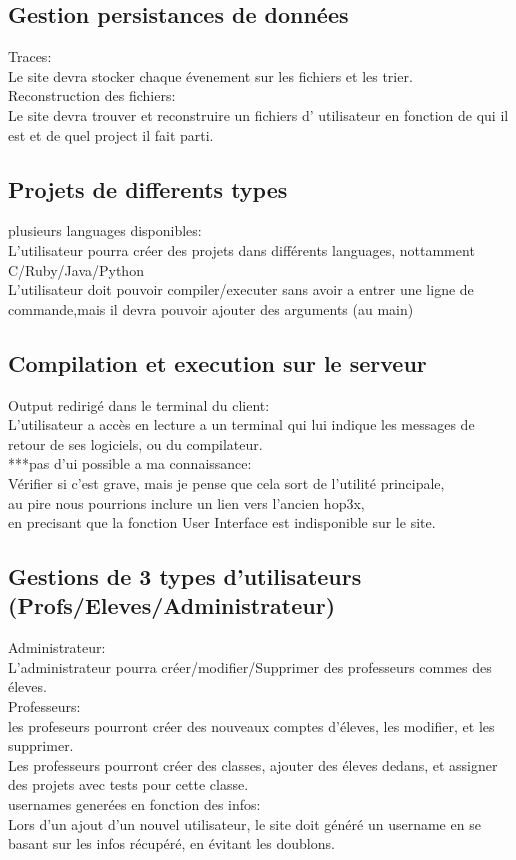 \documentclass[12pt,a4paper,twoside]{article}
\begin{document}
\subsection{Gestion persistances de données}
Traces:\\
Le site devra stocker chaque évenement sur les fichiers et les trier.\\
Reconstruction des fichiers:\\
Le site devra trouver et reconstruire un fichiers d' utilisateur en fonction de qui il est et de quel project il fait parti.\\
\subsection{Projets de differents types }
plusieurs languages disponibles:\\
L'utilisateur pourra créer des projets dans différents languages, nottamment C/Ruby/Java/Python\\
L'utilisateur doit pouvoir compiler/executer sans avoir a entrer une ligne de commande,mais il devra pouvoir ajouter des arguments (au main)\\
\subsection{Compilation et execution sur le serveur}
Output redirigé dans le terminal du client:\\
L'utilisateur a accès en lecture a un terminal qui lui indique les messages de retour de ses logiciels, ou du compilateur.\\
***pas d'ui possible a ma connaissance:\\
Vérifier si c'est grave, mais je pense que cela sort de l'utilité principale,\\
au pire nous pourrions inclure un lien vers l'ancien hop3x,\\
en precisant que la fonction User Interface est indisponible sur le site.\\
\subsection{Gestions de 3 types d'utilisateurs (Profs/Eleves/Administrateur)}
Administrateur:\\
L'administrateur pourra créer/modifier/Supprimer des professeurs commes des éleves.\\
Professeurs:\\
les profeseurs pourront créer des nouveaux comptes d'éleves, les modifier, et les supprimer.\\
Les professeurs pourront créer des classes, ajouter des éleves dedans, et assigner des projets avec tests pour cette classe.\\
usernames generées en fonction des infos:\\
Lors d'un ajout d'un nouvel utilisateur, le site doit généré un username en se basant sur les infos récupéré, en évitant les doublons.\\
\end{document}
